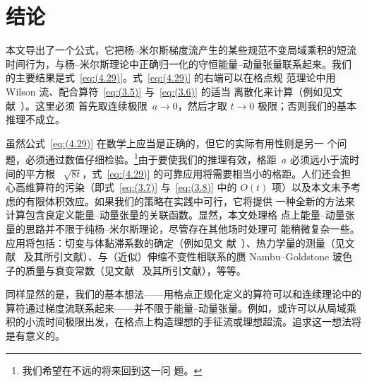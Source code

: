 \section{结论}
本文导出了一个公式，它把杨--米尔斯梯度流产生的某些规范不变局域乘积的短流
时间行为，与杨--米尔斯理论中正确归一化的守恒能量--动量张量联系起来。我们
的主要结果是式~\eqref{eq:(4.29)}。式~\eqref{eq:(4.29)} 的右端可以在格点规
范理论中用 Wilson 流、配合算符~\eqref{eq:(3.5)} 与~\eqref{eq:(3.6)} 的适当
离散化来计算（例如见文献~\cite{Luscher:2010iy,Borsanyi:2012zs}）。这里必须
首先取连续极限~$a\to0$，然后才取 $t\to0$ 极限；否则我们的基本推理不成立。

虽然公式~\eqref{eq:(4.29)} 在数学上应当是正确的，但它的实际有用性则是另一
个问题，必须通过数值仔细检验。\footnote{我们希望在不远的将来回到这一问
题。}由于要使我们的推理有效，格距~$a$ 必须远小于流时间的平方根%
~$\sqrt{8t}$，式~\eqref{eq:(4.29)} 的可靠应用将需要相当小的格距。人们还会担
心高维算符的污染（即式~\eqref{eq:(3.7)} 与~\eqref{eq:(3.8)} 中的 $O(t)$
项）以及本文未予考虑的有限体积效应。如果我们的策略在实践中可行，它将提供
一种全新的方法来计算包含良定义能量--动量张量的关联函数。显然，本文处理格
点上能量--动量张量的思路并不限于纯杨--米尔斯理论，尽管存在其他场时处理可
能稍微复杂一些。应用将包括：切变与体黏滞系数的确定（例如见文
献~\cite{Meyer:2007ic,Meyer:2007dy}）、热力学量的测量（见文
献~\cite{Giusti:2012yj} 及其所引文献）、与（近似）伸缩不变性相联系的赝
Nambu--Goldstone 玻色子的质量与衰变常数（见文献~\cite{Appelquist:2010gy}
及其所引文献），等等。

同样显然的是，我们的基本想法——用格点正规化定义的算符可以和连续理论中的
算符通过梯度流联系起来——并不限于能量--动量张量。例如，或许可以从局域乘
积的小流时间极限出发，在格点上构造理想的手征流或理想超流。追求这一想法将
是有意义的。
